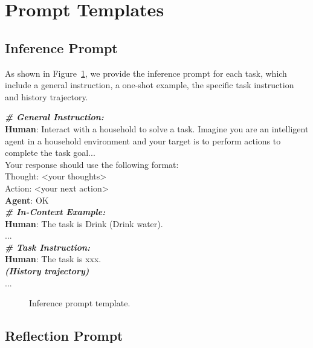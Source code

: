 \section{Prompt Templates}
\label{ref:prompt}

\subsection{Inference Prompt}
\label{ref:inference prompt}

As shown in Figure~\ref{fig:Inference prompt}, we provide the inference prompt for each task, which include a general instruction, a one-shot example, the specific task instruction and history trajectory.

\begin{tcolorbox}[breakable,title=Inference Prompt]
\textbf{\textit{\# General Instruction:}} \\
\textbf{Human}: Interact with a household to solve a task. Imagine you are an intelligent agent in a household environment and your target is to perform actions to complete the task goal...\\
Your response should use the following format: \\
Thought: <your thoughts> \\
Action: <your next action> \\
\textbf{Agent}: OK\\

\textbf{\textit{\# In-Context Example:}} \\
\textbf{Human}: The task is Drink (Drink water). \\
... \\

\textbf{\textit{\# Task Instruction:}} \\
\textbf{Human}: The task is xxx. \\
\textit{\textbf{(History trajectory)}} \\
... \\

\end{tcolorbox}
\begin{figure}[ht]
    \centering
    \vspace{-8pt}
    \caption{Inference prompt template.}
    \label{fig:Inference prompt}
\end{figure}

\subsection{Reflection Prompt}
\label{ref:reflection prompt}

